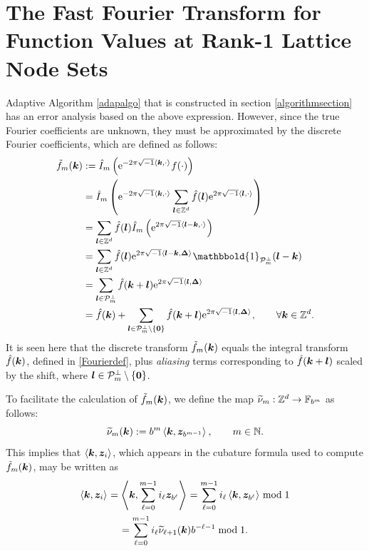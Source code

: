 \documentclass[graybox]{svmult}
\newcommand{\Z}{\mathbb{Z}} %
\newcommand{\N}{\mathbb{N}} %
\newcommand{\F}{\mathbb{F}} %
\newcommand{\bszero}{\boldsymbol{0}} %
\newcommand{\bsz}{\boldsymbol{z}}    %
\newcommand{\bsDelta}{\boldsymbol{\Delta}}    %
\newcommand{\ind}{\mathbbold{1}}
\begin{document}
\section{The Fast Fourier Transform for Function Values at Rank-1 Lattice Node Sets}\label{FFT}

Adaptive Algorithm \ref{adapalgo} that is constructed in section \ref{algorithmsection} has an error analysis based on the above expression.  However, since the true Fourier coefficients are unknown, they must be approximated by the discrete Fourier coefficients, which are defined as follows:
\begin{subequations} \label{tfdefalias}
\begin{align}
\tf_m(\bsk)
&:= \hI_m\left( \E^{-2 \pi \sqrt{-1} \ip{\bsk}{\cdot}} f(\cdot) \right) \label{tfdef}\\
\nonumber
& = \hI_m\left( \E^{-2 \pi \sqrt{-1} \ip{\bsk}{\cdot}} \sum_{\bsl \in \Z^d} \hf(\bsl) \E^{2 \pi \sqrt{-1} \ip{\bsl}{\cdot}}  \right) \\
\nonumber
& = \sum_{\bsl \in \Z^d} \hf(\bsl) \hI_m\left( \E^{2 \pi \sqrt{-1} \ip{\bsl-\bsk}{\cdot}}  \right) \\
\nonumber
& = \sum_{\bsl \in \Z^d} \hf(\bsl) \E^{2 \pi \sqrt{-1} \ip{\bsl - \bsk}{\bsDelta}} \ind_{\cp_m^{\perp}}(\bsl - \bsk) \\
\nonumber
& = \sum_{\bsl \in \cp^{\perp}_m} \hf(\bsk+\bsl) \E^{2 \pi \sqrt{-1} \ip{\bsl }{\bsDelta}} \\
&= \hf(\bsk) + \sum_{\bsl \in \cp^{\perp}_m\setminus \{\bszero\}} \hf(\bsk+\bsl) \E^{2 \pi \sqrt{-1} \ip{\bsl }{\bsDelta}}, \qquad \forall \bsk \in \Z^d. \label{tfassum}
\end{align}
\end{subequations}
It is seen here that the discrete transform $\tilde{f}_m(\boldsymbol{k})$ equals the integral transform $\hat{f}(\boldsymbol{k})$, defined in \eqref{Fourierdef}, plus \emph{aliasing} terms corresponding to $\hat{f}(\boldsymbol{k}+\boldsymbol{l})$ scaled by the shift, where $\bsl \in \cp_{m}^{\perp}\setminus \left\{\bszero\right\}$.


To facilitate the calculation of $\tilde{f}_m(\boldsymbol{k})$, we define the map $\tnu_m : \Z^d \to \F_{b^m}$ as follows:
\begin{equation} \label{kdotzbm}
\tnu_{m}(\bsk) := b^{m} \ip{\bsk}{\bsz_{b^{m-1}}}, \qquad m \in \N.
\end{equation}
This implies that $\ip{\bsk}{\bsz_i}$, which appears in the cubature formula used to compute $\tilde{f}_m(\boldsymbol{k})$, may be written as
\begin{multline} \label{kdotzi}
\ip{\bsk}{\bsz_i} = \ip{\bsk}{\sum_{\ell=0}^{m-1} i_\ell \bsz_{b^{\ell}}} = \sum_{\ell=0}^{m-1} i_\ell \ip{\bsk}{\bsz_{b^{\ell}}} \bmod 1 \\
=\sum_{\ell=0}^{m-1} i_\ell \tnu_{\ell+1}(\bsk)  b^{-\ell-1} \bmod 1.
\end{multline}
\end{document}
